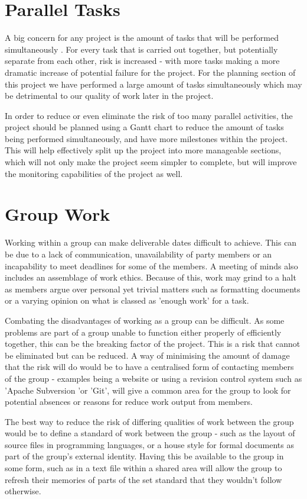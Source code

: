 \section{Parallel Tasks}
A big concern for any project is the amount of tasks that will be performed
simultaneously \cite{OracleWP}. For every task that is carried out together, 
but potentially separate from each other, risk is increased - with more tasks 
making a more dramatic increase of potential failure for the project. For the 
planning section of this project we have performed a large amount of tasks 
simultaneously which may be detrimental to our quality of work later in the 
project.

In order to reduce or even eliminate the risk of too many parallel activities,
the project should be planned using a Gantt chart to reduce the amount of tasks 
being performed simultaneously, and have more milestones within the project.  
This will help effectively split up the project into more manageable sections, 
which will not only make the project seem simpler to complete, but will improve 
the monitoring capabilities of the project as well.

\section{Group Work}
Working within a group can make deliverable dates difficult to achieve.  This
can be due to a lack of communication, unavailability of party members or an
incapability to meet deadlines for some of the members. A meeting of minds also
includes an assemblage of work ethics.  Because of this, work may grind to a
halt as members argue over personal yet trivial matters such as formatting
documents or a varying opinion on what is classed as 'enough work' for a task.

Combating the disadvantages of working as a group can be difficult. As some
problems are part of a group unable to function either properly of efficiently
together, this can be the breaking factor of the project.  This is a risk that
cannot be eliminated but can be reduced. A way of minimising the amount of
damage that the risk will do would be to have a centralised form of contacting
members of the group - examples being a website or using a revision control
system such as 'Apache Subversion 'or 'Git', will give a common area for the
group to look for potential absences or reasons for reduce work output from
members. 

The best way to reduce the risk of differing qualities of work between the group
would be to define a standard of work between the group - such as the layout of
source files in programming languages, or a house style for formal documents as
part of the group's external identity. Having this be available to the group in
some form, such as in a text file within a shared area will allow the group to
refresh their memories of parts of the set standard that they wouldn't follow
otherwise.

